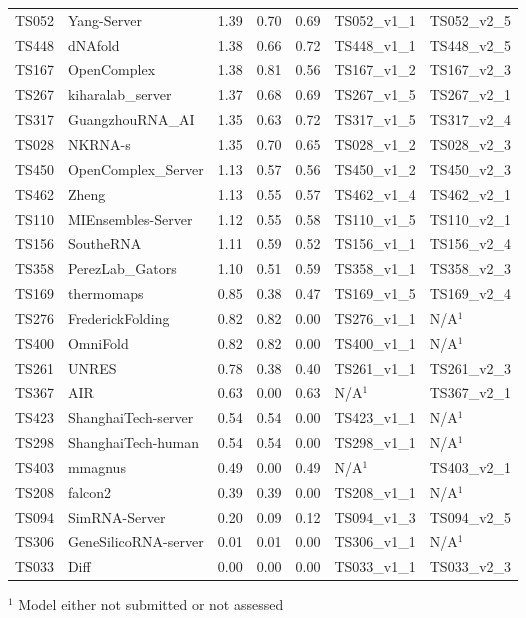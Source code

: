 \begin{table}[ht]
{\begin{tabular}{llrrrll}
TS052 & Yang-Server & 1.39 & 0.70 & 0.69 & TS052\_v1\_1 & TS052\_v2\_5 \\ 
TS448 & dNAfold & 1.38 & 0.66 & 0.72 & TS448\_v1\_1 & TS448\_v2\_5 \\ 
TS167 & OpenComplex & 1.38 & 0.81 & 0.56 & TS167\_v1\_2 & TS167\_v2\_3 \\ 
TS267 & kiharalab\_server & 1.37 & 0.68 & 0.69 & TS267\_v1\_5 & TS267\_v2\_1 \\ 
TS317 & GuangzhouRNA\_AI & 1.35 & 0.63 & 0.72 & TS317\_v1\_5 & TS317\_v2\_4 \\ 
TS028 & NKRNA-s & 1.35 & 0.70 & 0.65 & TS028\_v1\_2 & TS028\_v2\_3 \\ 
TS450 & OpenComplex\_Server & 1.13 & 0.57 & 0.56 & TS450\_v1\_2 & TS450\_v2\_3 \\ 
TS462 & Zheng & 1.13 & 0.55 & 0.57 & TS462\_v1\_4 & TS462\_v2\_1 \\ 
TS110 & MIEnsembles-Server & 1.12 & 0.55 & 0.58 & TS110\_v1\_5 & TS110\_v2\_1 \\ 
TS156 & SoutheRNA & 1.11 & 0.59 & 0.52 & TS156\_v1\_1 & TS156\_v2\_4 \\ 
TS358 & PerezLab\_Gators & 1.10 & 0.51 & 0.59 & TS358\_v1\_1 & TS358\_v2\_3 \\ 
TS169 & thermomaps & 0.85 & 0.38 & 0.47 & TS169\_v1\_5 & TS169\_v2\_4 \\ 
TS276 & FrederickFolding & 0.82 & 0.82 & 0.00 & TS276\_v1\_1 & N/A$^{1}$ \\ 
TS400 & OmniFold & 0.82 & 0.82 & 0.00 & TS400\_v1\_1 & N/A$^{1}$ \\ 
TS261 & UNRES & 0.78 & 0.38 & 0.40 & TS261\_v1\_1 & TS261\_v2\_3 \\ 
TS367 & AIR & 0.63 & 0.00 & 0.63 & N/A$^{1}$ & TS367\_v2\_1 \\ 
TS423 & ShanghaiTech-server & 0.54 & 0.54 & 0.00 & TS423\_v1\_1 & N/A$^{1}$ \\ 
TS298 & ShanghaiTech-human & 0.54 & 0.54 & 0.00 & TS298\_v1\_1 & N/A$^{1}$ \\ 
TS403 & mmagnus & 0.49 & 0.00 & 0.49 & N/A$^{1}$ & TS403\_v2\_1 \\ 
TS208 & falcon2 & 0.39 & 0.39 & 0.00 & TS208\_v1\_1 & N/A$^{1}$ \\ 
TS094 & SimRNA-Server & 0.20 & 0.09 & 0.12 & TS094\_v1\_3 & TS094\_v2\_5 \\ 
TS306 & GeneSilicoRNA-server & 0.01 & 0.01 & 0.00 & TS306\_v1\_1 & N/A$^{1}$ \\ 
TS033 & Diff & 0.00 & 0.00 & 0.00 & TS033\_v1\_1 & TS033\_v2\_3 \\ 
\bottomrule
\end{tabular}%
}
\begin{flushleft}\footnotesize $^{1}$ Model either not submitted or not assessed\end{flushleft}
\end{table}
